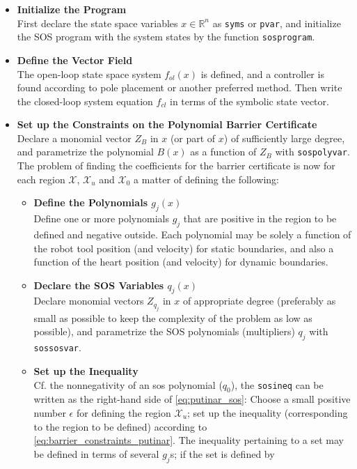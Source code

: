 \renewcommand{\labelitemii}{$\circ$}
\renewcommand{\labelitemiii}{$\bullet$}
\begin{itemize}
	\itemsep-0.5mm
	\item \textbf{Initialize the Program}\\
	First declare the state space variables $x\in\mathbb{R}^n$ as \texttt{syms} or \texttt{pvar}, and initialize the SOS program with the system states by the function \texttt{sosprogram}.
	\item \textbf{Define the Vector Field}\\
	The open-loop state space system $f_{ol}(x)$ is defined, and a controller is found according to pole placement or another preferred method. Then write the closed-loop system equation $f_{cl}$ in terms of the symbolic state vector.
	\item \textbf{Set up the Constraints on the Polynomial Barrier Certificate}\\
	Declare a monomial vector $Z_B$ in $x$ (or part of $x$) of sufficiently large degree, and parametrize the polynomial $B(x)$ as a function of $Z_B$ with \texttt{sospolyvar}.  
	The problem of finding the coefficients for the barrier certificate is now for each region $\mathcal{X}$, $\mathcal{X}_u$ and $\mathcal{X}_0$ a matter of defining the following:
	\vspace*{-1mm}
	\begin{itemize}
		\item \textbf{Define the Polynomials $g_j(x)$}\\
		Define one or more polynomials $g_j$ that are positive in the region to be defined and negative outside. Each polynomial may be solely a function of the robot tool position (and velocity) for static boundaries, and also a function of the heart position (and velocity) for dynamic boundaries. 
		\item \textbf{Declare the SOS Variables $q_j(x)$}\\
		Declare monomial vectors $Z_{q_j}$ in $x$ of appropriate degree (preferably as small as possible to keep the complexity of the problem as low as possible), and parametrize the SOS polynomials (multipliers) $q_j$ with \texttt{sossosvar}.
		\item \textbf{Set up the Inequality}\\
		Cf. the nonnegativity of an \gls{sos} polynomial ($q_0$), the \texttt{sosineq} can be written as the right-hand side of \autoref{eq:putinar_sos}: Choose a small positive number $\epsilon$ for defining the region $\mathcal{X}_u$;
		set up the inequality (corresponding to the region to be defined) according to \autoref{eq:barrier_constraints_putinar}. The inequality pertaining to a set may be defined in terms of several $g_j$s; if the set is defined by

\end{itemize}
\end{itemize}
